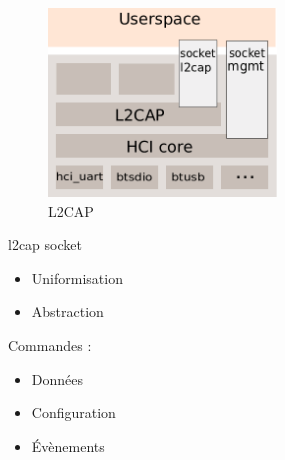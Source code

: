 \begin{frame}
\begin{minipage}[t]{0.60\linewidth}
	\begin{figure}
		\includegraphics[height=5cm]{bluez_kernel_l2cap_sock.png}
		\caption{L2CAP}
	\end{figure}
\end{minipage}
\begin{minipage}[t]{0.30\linewidth}
	\begin{block}{l2cap socket}
		\begin{itemize}
			\item Uniformisation
			\item Abstraction
		\end{itemize}
		Commandes : 
		\begin{itemize}
			\item Données
			\item Configuration
			\item Évènements
		\end{itemize}
	\end{block}
\end{minipage}
\end{frame}

